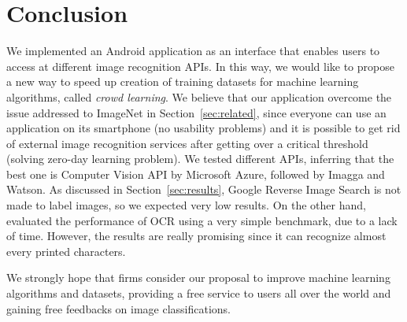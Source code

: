\section{Conclusion}
\label{sec:conclusion}

We implemented an Android application as an interface that enables users to access at different image recognition APIs. In this way, we would like to propose a new way to speed up creation of training  datasets for machine learning algorithms, called \textit{crowd learning}. We believe that our application overcome the issue addressed to ImageNet in Section~\ref{sec:related}, since everyone can use an application on its smartphone (no usability problems) and it is possible to get rid of external image recognition services after getting over a critical threshold (solving zero-day learning problem).
We tested different APIs, inferring that the best one is Computer Vision API by Microsoft Azure\cite{Microsoft}, followed by Imagga\cite{Imagga} and Watson\cite{IBM}. As discussed in Section~\ref{sec:results}, Google Reverse Image Search\cite{Google} is not made to label images, so we expected very low results. On the other hand, evaluated the performance of OCR using a very simple benchmark, due to a lack of time. However, the results are really promising since it can recognize almost every printed characters.

We strongly hope that firms consider our proposal to improve machine learning algorithms and datasets, providing a free service to users all over the world and gaining free feedbacks on image classifications.